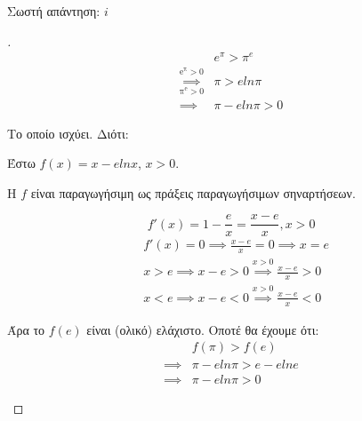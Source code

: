 \setcounter{equation}{0}
\question \textgreek{Σωστή απάντηση: $i$}
\begin{proof}[\unskip\nopunct]
\begin{align*}
    &e^\pi > \pi^e\\
    \underset{\mathrm{\pi^e > 0}}{\overset{\mathrm{e^\pi > 0}}{\implies}}& \pi > eln\pi\\
    \implies& \pi - eln\pi > 0
\end{align*}
\begin{center}
\textgreek{Το οποίο ισχύει. Διότι: }
        
\textgreek{Έστω $f(x) = x-elnx$, $x > 0$.}
        
\textgreek{Η $f$ είναι παραγωγήσιμη ως πράξεις παραγωγήσιμων σηναρτήσεων.}
\end{center}
\begin{equation*}
    f'(x) = 1 - \frac{e}{x} = \frac{x-e}{x}, x>0
\end{equation*}
\begin{align*}
    &f'(x) = 0 \implies \frac{x-e}{x} = 0 \implies x = e\\
    &x > e \implies x-e > 0 \overset{x>0}{\implies} \frac{x-e}{x} > 0\\
    &x < e \implies x-e < 0 \overset{x>0}{\implies} \frac{x-e}{x} < 0
\end{align*}

\begin{center}
\end{center}

\begin{center}
\textgreek{Άρα το $f(e)$ είναι (ολικό) ελάχιστο. Οποτέ θα έχουμε ότι: }
\begin{align*}
    &f(\pi) > f(e)\\
    \implies &\pi - eln\pi > e - elne\\
    \implies &\pi - eln\pi > 0
\end{align*}
\end{center}
\end{proof}